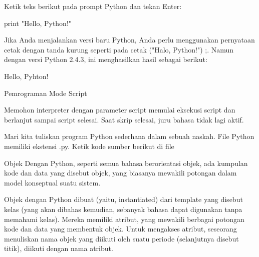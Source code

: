 \vspace{14pt}
\noindent 
{\fontsize{14pt}{14pt}\selectfont Ketik teks berikut pada prompt Python dan tekan Enter: \\} \par
\vspace{14pt}
\noindent 
{\fontsize{14pt}{14pt}\selectfont print "Hello, Python!" \\} \par
\vspace{14pt}
\noindent 
{\fontsize{14pt}{14pt}\selectfont Jika Anda menjalankan versi baru Python, Anda perlu menggunakan pernyataan cetak dengan tanda kurung seperti pada cetak ("Halo, Python!") ;. Namun dengan versi Python 2.4.3, ini menghasilkan hasil sebagai berikut: \\} \par
\vspace{14pt}
\noindent 
{\fontsize{14pt}{14pt}\selectfont Hello, Pyhton! \\} \par
\vspace{14pt}
\noindent 
{\fontsize{14pt}{14pt}\selectfont Pemrograman Mode Script \\} \par
\noindent 
{\fontsize{14pt}{14pt}\selectfont Memohon interpreter dengan parameter script memulai eksekusi script dan berlanjut sampai script selesai. Saat skrip selesai, juru bahasa tidak lagi aktif. \\} \par
\vspace{14pt}
\noindent 
{\fontsize{14pt}{14pt}\selectfont Mari kita tuliskan program Python sederhana dalam sebuah naskah. File Python memiliki ekstensi .py. Ketik kode sumber berikut di file \\} \par
\vspace{14pt}
\noindent 
{\fontsize{14pt}{14pt}\selectfont Objek Dengan Python, seperti semua bahasa berorientasi objek, ada kumpulan kode dan data yang disebut objek, yang biasanya mewakili potongan dalam model konseptual suatu sistem. \\} \par
\vspace{14pt}
\noindent 
{\fontsize{14pt}{14pt}\selectfont Objek dengan Python dibuat (yaitu, instantiated) dari template yang disebut kelas (yang akan dibahas kemudian, sebanyak bahasa dapat digunakan tanpa memahami kelas). Mereka memiliki atribut, yang mewakili berbagai potongan kode dan data yang membentuk objek. Untuk mengakses atribut, seseorang menuliskan nama objek yang diikuti oleh suatu periode (selanjutnya disebut titik), diikuti dengan nama atribut. \\} \par
